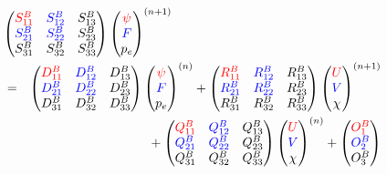 \begin{eqnarray}
  \label{eq:field_advance}
  \lefteqn{
  \begin{pmatrix}
    \cola{S^B_{1 1}} & \colb{S^B_{1 2}} & S^B_{1 3}\\
    \colb{S^B_{2 1}} & \colb{S^B_{2 2}} & S^B_{2 3}\\
          S^B_{3 1}  &       S^B_{3 2}  & S^B_{3 3}\\
  \end{pmatrix} 
  \begin{pmatrix}
    \cola{\psi}\\ \colb{F}\\ p_e
  \end{pmatrix}^{(n+1)}}\\
  & = & 
  \begin{pmatrix}
    \cola{D^B_{1 1}} & \colb{D^B_{1 2}} & D^B_{1 3}\\
    \colb{D^B_{2 1}} & \colb{D^B_{2 2}} & D^B_{2 3}\\
          D^B_{3 1}  &       D^B_{3 2}  & D^B_{3 3}\\
  \end{pmatrix} 
  \begin{pmatrix}
    \cola{\psi}\\ \colb{F}\\ p_e
  \end{pmatrix}^{(n)} +
  \begin{pmatrix}
    \cola{R^B_{1 1}} & \colb{R^B_{1 2}} & R^B_{1 3}\\
    \colb{R^B_{2 1}} & \colb{R^B_{2 2}} & R^B_{2 3}\\
          R^B_{3 1}  &       R^B_{3 2}  & R^B_{3 3}\\
  \end{pmatrix} 
  \begin{pmatrix}
    \cola{U}\\ \colb{V}\\ \chi
  \end{pmatrix}^{(n+1)} \nonumber
  \\ & & \mbox{} +
  \begin{pmatrix}
    \cola{Q^B_{1 1}} & \colb{Q^B_{1 2}} & Q^B_{1 3}\\
    \colb{Q^B_{2 1}} & \colb{Q^B_{2 2}} & Q^B_{2 3}\\
          Q^B_{3 1}  &       Q^B_{3 2}  & Q^B_{3 3}\\
  \end{pmatrix} 
  \begin{pmatrix}
    \cola{U}\\ \colb{V}\\ \chi
  \end{pmatrix}^{(n)} +
  \begin{pmatrix}
    \cola{O^B_{1}}\\
    \colb{O^B_{2}}\\
          O^B_{3} \\
  \end{pmatrix} \nonumber
\end{eqnarray}

